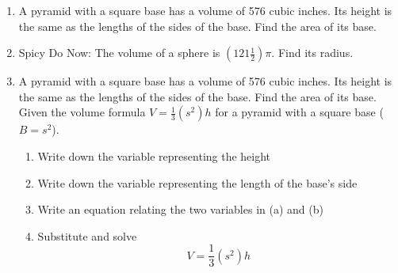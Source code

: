 \begin{enumerate}
\item A pyramid with a square base has a volume of 576 cubic inches. Its height is the same as the lengths of the sides of the base. Find the area of its base.

\item Spicy Do Now: The volume of a sphere is $(121 \frac{1}{2}) \pi$. Find its radius. \vspace{1cm}

\item A pyramid with a square base has a volume of 576 cubic inches. Its height is the same as the lengths of the sides of the base. Find the area of its base.\\[0.5cm] Given the volume formula $V=\frac{1}{3}(s^2)h$ for a pyramid with a square base ($B=s^2$).
\begin{enumerate}[itemsep=0.5cm]
  \item Write down the variable representing the height
  \item Write down the variable representing the length of the base's side
  \item Write an equation relating the two variables in (a) and (b)
  \item Substitute and solve \[V=\frac{1}{3}(s^2)h\]
\end{enumerate} \vspace{2cm}


\end{enumerate}
